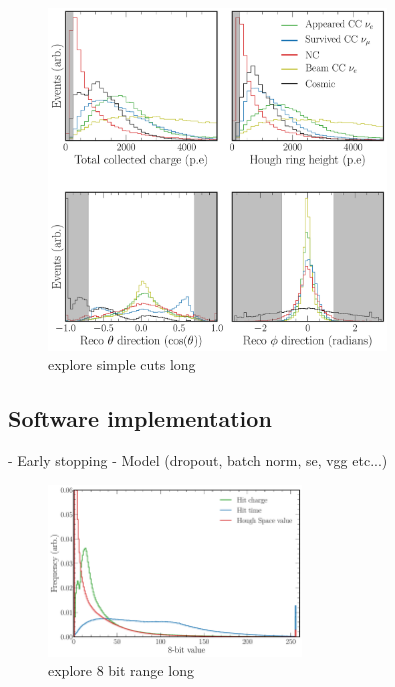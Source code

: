 \begin{figure} %
    \includegraphics[width=0.8\textwidth]{diagrams/7-cvn/chipsnet/explore_simple_cuts.pdf}
    \caption[explore simple cuts short]
    {explore simple cuts long}
    \label{fig:explore_simple_cuts}
\end{figure}

\subsection{Software implementation} %
\label{sec:cvn_baseline_soft} %

- Early stopping
- Model (dropout, batch norm, se, vgg etc...)

\begin{figure} %
    \includegraphics[width=0.6\textwidth]{diagrams/7-cvn/chipsnet/explore_8_bit_range.pdf}
    \caption[explore 8 bit range short]
    {explore 8 bit range long}
    \label{fig:explore_8_bit_range}
\end{figure}

